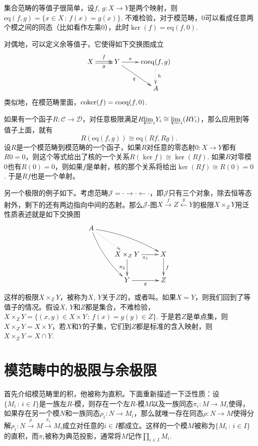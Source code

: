 集合范畴的等值子很简单，设$f$, $g:X\to Y$是两个映射，则$\mathrm{eq}(f,g)=\{x\in X\,:\, f(x)=g(x)\}$. 不难检验，对于模范畴，$0$可以看成任意两个模之间的同态（比如看作左乘$0$），此时$\ker(f)=\mathrm{eq}(f,0)$. 

对偶地，可以定义余等值子，它使得如下交换图成立
\[
\begin{xy}
	\xymatrix{
		X\ar@<0.3ex>[r]^-{f} \ar@<-0.3ex>[r]_-{g}&Y\ar[r]^-{\pi}\ar[dr]_-{q}&\mathrm{coeq}(f,g)\ar@{.>}[d]^-{h}\\
		&&A
	}
\end{xy}
\]
类似地，在模范畴里面，$\operatorname{coker}(f)=\mathrm{coeq}(f,0)$.

如果有一个函子$R:\mathcal{C}\to \mathcal{D}$，对任意极限满足$R{\varprojlim}_i Y_i\cong {\varprojlim}_i (RY_i)$，那么应用到等值子上面，就有
\[
	R\left(\mathrm{eq}(f,g)\right)\cong \mathrm{eq}(Rf,Rg).
\]
设$R$是一个模范畴到模范畴的一个函子，如果$R$对任意的零态射$0:X\to Y$都有$R0=0$，则这个等式给出了核的一个关系$R\left(\ker f\right)\cong \ker(Rf)$. 如果$R$对零模$0$也有$R(0)=0$，则如果$f$是单射，核的那个关系将给出$\ker(Rf)\cong R(0)=0$. 于是$Rf$也是一个单射。

\para 另一个极限的例子如下。考虑范畴$\mathcal{J}=\cdot \to \cdot \leftarrow \cdot$，即$\mathcal{J}$只有三个对象，除去恒等态射外，剩下的还有两边指向中间的态射。那么$\mathcal{J}$-图$X\xrightarrow{f} Z \xleftarrow{g} Y$的极限$X\times_Z Y$用泛性质表述就是如下交换图
\[
\begin{xy}
	\xymatrix{
		A\ar@/_/[rdd]\ar@/^/[drr]\ar@{.>}[dr]&&\\
		&X\times_Z Y\ar[d]_{\pi_2}\ar[r]_{\pi_1}&X\ar[d]^f\\
		&Y\ar[r]_g&Z
	}
\end{xy}
\]
这样的极限$X\times_Z Y$，被称为$X$, $Y$关于$Z$的，或者叫。如果$X=Y$，则我们回到了等值子的情况。假设$X$, $Y$和$Z$都是集合，不难检验，$X\times_Z Y=\{(x,y)\in X \times Y\,:\,f(x)=g(y)\in Z\}$. 于是若$Z$是单点集，则$X\times_Z Y=X\times Y$，若$X$和$Y$的子集，它们到$Z$都是标准的含入映射，则$X\times_Z Y=X\cap Y$.

\section{模范畴中的极限与余极限}

\para 首先介绍模范畴里的积，他被称为直积。下面重新描述一下泛性质：设$\{M_i\,:\, i\in I\}$是一族左$R$-模，则存在一个左$R$-模$M$以及一族同态$\pi_i:M\to M_i$使得，如果存在另一个模$N$和一族同态$\rho_i:N\to M_i$，那么就唯一存在同态$\rho:N\to M$使得分解$\rho_i:N\xrightarrow{\rho} M \xrightarrow{\pi_i} M_i$成立对任意的$i\in I$都成立。这样的一个模$M$被称为$\{M_i\,:\, i\in I\}$的直积，而$\pi_i$被称为典范投影，通常将$M$记作$\prod_{i\in I}M_i$. 

